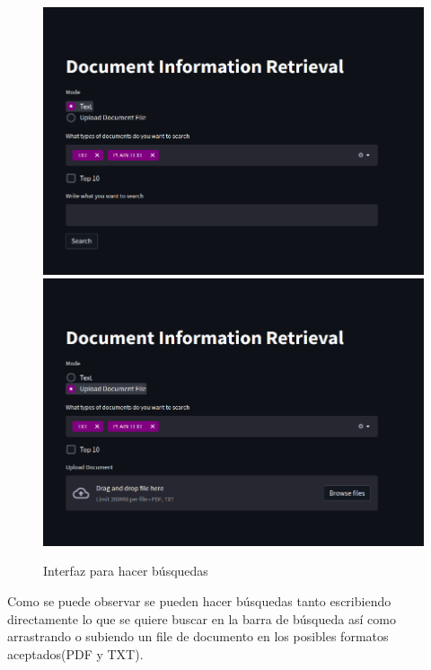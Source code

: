 \documentclass{llncs}
\begin{document}
\begin{figure}
    \caption{Interfaz para hacer búsquedas}
    \includegraphics[scale = .28]{./images/ui_tex_search.png}
    \includegraphics[scale = .28]{./images/ui_uploadsearch.png}
\end{figure}

\noindent
Como se puede observar se pueden hacer búsquedas tanto escribiendo directamente 
lo que se quiere buscar en la barra de búsqueda así como arrastrando o subiendo 
un file de documento en los posibles formatos aceptados(PDF y TXT).
\end{document}
